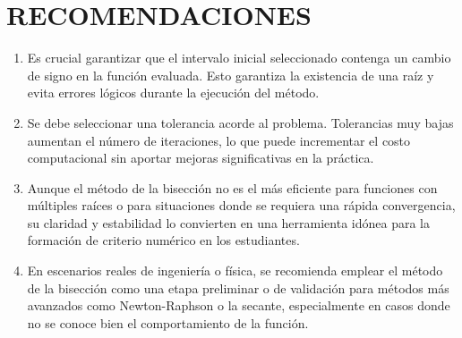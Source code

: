 \documentclass[12pt]{article}
\begin{document}
\vspace{0.5cm}

\section*{RECOMENDACIONES}
\begin{enumerate}
    \item  Es crucial garantizar que el intervalo inicial seleccionado contenga un cambio de signo en la función evaluada. Esto garantiza la existencia de una raíz y evita errores lógicos durante la ejecución del método.
    
    \item  Se debe seleccionar una tolerancia acorde al problema. Tolerancias muy bajas aumentan el número de iteraciones, lo que puede incrementar el costo computacional sin aportar mejoras significativas en la práctica.
    
    \item  Aunque el método de la bisección no es el más eficiente para funciones con múltiples raíces o para situaciones donde se requiera una rápida convergencia, su claridad y estabilidad lo convierten en una herramienta idónea para la formación de criterio numérico en los estudiantes.
    
    \item En escenarios reales de ingeniería o física, se recomienda emplear el método de la bisección como una etapa preliminar o de validación para métodos más avanzados como Newton-Raphson o la secante, especialmente en casos donde no se conoce bien el comportamiento de la función.
\end{enumerate}

\vspace{0.5cm}


\renewcommand{\refname}{\MakeUppercase{REFERENCIAS}}


\end{document}
